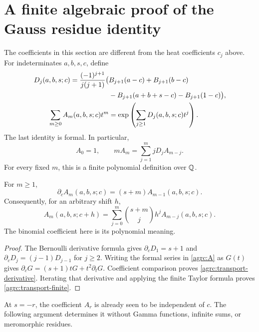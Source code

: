 \section{A finite algebraic proof of the Gauss residue identity}
\label{agrc:gauss-residue-section}

The coefficients in this section are different from the heat coefficients
$c_j$ above. For indeterminates $a,b,s,c$, define
\begin{align}
 D_j(a,b,s;c)=\frac{(-1)^{j+1}}{j(j+1)}
 \bigl(&B_{j+1}(a-c)+B_{j+1}(b-c)\notag\\
       &-B_{j+1}(a+b+s-c)-B_{j+1}(1-c)\bigr),\label{agrc:D}\\
 \sum_{m\geq0}A_m(a,b,s;c)t^m
 &=\exp\left(\sum_{j\geq1}D_j(a,b,s;c)t^j\right).
 \label{agrc:A}
\end{align}
The last identity is formal. In particular,
\begin{equation}\label{agrc:A-rec}
 A_0=1,\qquad mA_m=\sum_{j=1}^m jD_j A_{m-j}.
\end{equation}
For every fixed $m$, this is a finite polynomial definition over $\mathbb Q$.

\begin{lemma}
\label{agrc:transport}
For $m\geq1$,
\begin{equation}\label{agrc:transport-derivative}
 \partial_c A_m(a,b,s;c)=(s+m)A_{m-1}(a,b,s;c).
\end{equation}
Consequently, for an arbitrary shift $h$,
\begin{equation}\label{agrc:transport-finite}
 A_m(a,b,s;c+h)=\sum_{j=0}^{m}
        \binom{s+m}{j}h^j A_{m-j}(a,b,s;c).
\end{equation}
The binomial coefficient here is its polynomial meaning.
\end{lemma}
\begin{proof}
The Bernoulli derivative formula gives
$\partial_cD_1=s+1$ and
$\partial_cD_j=(j-1)D_{j-1}$ for $j\geq2$.
Writing the formal series in \eqref{agrc:A} as $G(t)$ gives
$\partial_cG=(s+1)tG+t^2\partial_tG$. Coefficient comparison proves
\eqref{agrc:transport-derivative}. Iterating that derivative and applying
the finite Taylor formula proves \eqref{agrc:transport-finite}.
\end{proof}

At $s=-r$, the coefficient $A_r$ is already seen to be independent of $c$.
The following argument determines it without Gamma functions, infinite
sums, or meromorphic residues.

